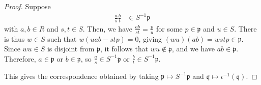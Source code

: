 \documentclass[10pt]{mypackage}
\begin{document}
\begin{proof}
  Suppose
  \begin{align*}
    \frac{a}{s}\frac{b}{t} &\in S^{-1} \mathfrak{p}
  \end{align*}
  with $a,b\in R$ and $s,t\in S$. Then, we have $\frac{ab}{st} = \frac{p}{u}$ for some $p\in \mathfrak{p}$ and $u\in S$. There is thus $w\in S$ such that $w\left( uab - stp \right) = 0$, giving $\left( wu \right)\left( ab \right) = wstp\in \mathfrak{p}$. Since $wu\in S$ is disjoint from $ \mathfrak{p} $, it follows that $wu\notin \mathfrak{p}$, and we have $ab\in \mathfrak{p}$. Therefore, $a\in \mathfrak{p}$ or $b\in \mathfrak{p}$, so $\frac{a}{s}\in S^{-1} \mathfrak{p}$ or $\frac{b}{t}\in S^{-1} \mathfrak{p}$.

  This gives the correspondence obtained by taking $ \mathfrak{p}\mapsto S^{-1} \mathfrak{p} $ and $ \mathfrak{q}\mapsto \iota^{-1}\left( \mathfrak{q} \right) $.
\end{proof}
\end{document}
